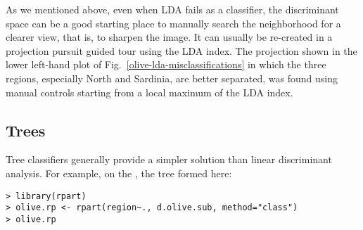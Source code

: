 As we mentioned above, even when LDA fails as a classifier, the
discriminant space can be a good starting place to manually search the
neighborhood for a clearer view, that is, to sharpen the image.  It
can usually be re-created in a projection pursuit guided tour using
the LDA index. The projection shown in the lower left-hand plot of
Fig.~\ref{olive-lda-misclassifications} in which the three regions,
especially North and Sardinia, are better separated, was found using
manual controls starting from a local maximum of the LDA index.











\subsection{Trees}




Tree classifiers generally provide a simpler solution than linear
discriminant analysis. For example, on the , the tree
formed here:

\begin{verbatim}
> library(rpart)
> olive.rp <- rpart(region~., d.olive.sub, method="class")
> olive.rp
\end{verbatim}
 
